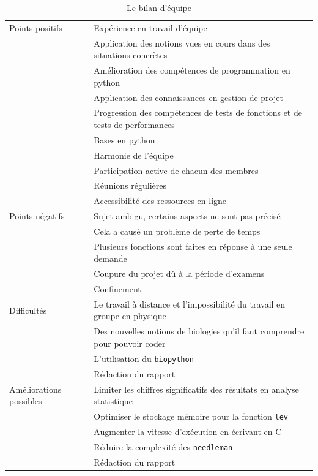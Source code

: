\documentclass[12pt]{article}
\begin{document}
        \begin{table}[!h]
            \centering
            \begin{tabular}{|l|l|}
                \hline
                Points positifs & Expérience en travail d'équipe \\
                 & Application des notions vues en cours dans des situations concrètes \\
                 & Amélioration des compétences de programmation en \textsf{python} \\
                 & Application des connaissances en gestion de projet \\
                 & Progression des compétences de tests de fonctions et de tests de performances \\
                 & Bases en \textsf{python} \\
                 & Harmonie de l'équipe \\
                 & Participation active de chacun des membres \\
                 & Réunions régulières \\
                 & Accessibilité des ressources en ligne \\
                \hline
                Points négatifs & Sujet ambigu, certains aspects ne sont pas précisé \\
                 & Cela a causé un problème de perte de temps \\
                 & Plusieurs fonctions sont faites en réponse à une seule demande \\
                 & Coupure du projet dû à la période d'examens \\ 
                 & Confinement \\
                \hline
                Difficultés & Le travail à distance et l'impossibilité du travail en groupe en physique \\
                 & Des nouvelles notions de biologies qu'il faut comprendre pour pouvoir coder \\
                 & L'utilisation du \texttt{biopython}\\ 
                 & Rédaction du rapport \\
                \hline
                Améliorations possibles & Limiter les chiffres significatifs des résultats en analyse statistique \\
                 & Optimiser le stockage mémoire pour la fonction \texttt{lev} \\
                 & Augmenter la vitesse d'exécution en écrivant en C \\
                 & Réduire la complexité des \texttt{needleman} \\
                 & Rédaction du rapport \\
                \hline
            \end{tabular}
            \caption{Le bilan d'équipe}
            \label{tab:my_label}
        \end{table}
    \newpage
\end{document}
